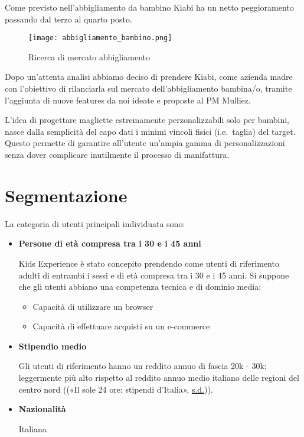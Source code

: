 \documentclass[12pt,italian,]{report}
\providecommand{\tightlist}{%
  \setlength{\itemsep}{0pt}\setlength{\parskip}{0pt}}
\begin{document}
Come previsto nell'abbigliamento da bambino Kiabi ha un netto
peggioramento passando dal terzo al quarto posto.

\begin{figure}
\centering
\texttt{[image: abbigliamento\_bambino.png]}
\caption{Ricerca di mercato abbigliamento}
\end{figure}

Dopo un'attenta analisi abbiamo deciso di prendere Kiabi, come azienda
madre con l'obiettivo di rilanciarla sul mercato dell'abbigliamento
bambina/o, tramite l'aggiunta di nuove features da noi ideate e proposte
al PM Mulliez.

L'idea di progettare magliette estremamente perzonalizzabili solo per
bambini, nasce dalla semplicità del capo dati i minimi vincoli fisici
(i.e.~taglia) del target. Questo permette di garantire all'utente
un'ampia gamma di personalizzazioni senza dover complicare inutilmente
il processo di manifattura.

\hypertarget{segmentazione}{%
\section{Segmentazione}\label{segmentazione}}

La categoria di utenti principali individuata sono:

\begin{itemize}
\item
  \textbf{Persone di età compresa tra i 30 e i 45 anni}

  Kids Experience è stato concepito prendendo come utenti di riferimento
  adulti di entrambi i sessi e di età compresa tra i 30 e i 45 anni. Si
  suppone che gli utenti abbiano una competenza tecnica e di dominio
  media:

  \begin{itemize}
  \tightlist
  \item
    Capacità di utilizzare un browser
  \item
    Capacità di effettuare acquisti su un e-commerce
  \end{itemize}
\item
  \textbf{Stipendio medio}

  Gli utenti di riferimento hanno un reddito annuo di fascia 20k - 30k:
  leggermente più alto rispetto al reddito annuo medio italiano delle
  regioni del centro nord ((«Il sole 24 ore: stipendi d'Italia»,
  \protect\hyperlink{ref-redditomedio}{s.d.})).
\item
  \textbf{Nazionalità}

  Italiana
\end{itemize}
\end{document}
